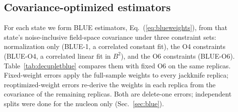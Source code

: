 \documentclass[aps,prd,preprint,nofootinbib,floatfix]{revtex4-2}
\begin{document}
\subsection{Covariance-optimized estimators}

For each state we form BLUE estimators, Eq.~(\ref{eq:blueweights}), from that state's noise-inclusive field-space covariance under three constraint sets: normalization only (BLUE-1, a correlated constant fit), the O4 constraints (BLUE-O4, a correlated linear fit in $B^2$), and the O6 constraints (BLUE-O6). Table~\ref{tab:decupletblue} compares them with fixed O6 on the same replicas. Fixed-weight errors apply the full-sample weights to every jackknife replica; reoptimized-weight errors re-derive the weights in each replica from the covariance of the remaining replicas. Both are delete-one errors; independent splits were done for the nucleon only (Sec.~\ref{sec:blue}).
\end{document}
